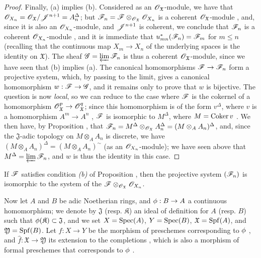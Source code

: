 \begin{proof}
Finally, (a) implies (b).
Considered as an $\mathscr{O}_\mathfrak{X}$-module, we have that $\mathscr{O}_{X_n}=\mathscr{O}_\mathfrak{X}/\mathscr{J}^{n+1}=A_n^\Delta$; but $\mathscr{F}_n=\mathscr{F}\otimes_{\mathscr{O}_\mathfrak{X}}\mathscr{O}_{X_n}$ is a coherent $\mathscr{O}_\mathfrak{X}$-module , and, since it is also an $\mathscr{O}_{X_n}$-module, and $\mathscr{J}^{n+1}$ is coherent, we conclude that $\mathscr{F}_n$ is a coherent $\mathscr{O}_{X_n}$-module , and it is immediate that $u_{mn}^*(\mathscr{F}_n)=\mathscr{F}_m$ for $m\leq n$ (recalling that the continuous map $X_m\to X_n$ of the underlying spaces is the identity on $\mathfrak{X}$).
The sheaf $\mathscr{G}=\varprojlim\mathscr{F}_n$ is thus a coherent $\mathscr{O}_\mathfrak{X}$-module, since we have seen that (b) implies (a). The canonical homomorphisms $\sh{F}\to\sh{F}_n$ form a projective system, which, by passing to the limit, gives a canonical homomorphism $w:\sh{F}\to\sh{G}$, and it remains only to prove that $w$ is bijective.
The question is now \emph{local}, so we can reduce to the case where $\mathscr{F}$ is the cokernel of a homomorphism $\sh{O}_\mathfrak{X}^p\to\sh{O}_\mathfrak{X}^q$; since this homomorphism is of the form $v^\Delta$, where $v$ is a homomorphism $A^m\to A^n$ , $\mathscr{F}$ is isomorphic to $M^\Delta$, where $M=\operatorname{Coker}{v}$ .
We then have, by Proposition , that $\mathscr{F}_n=M^\Delta\otimes_{\mathscr{O}_\mathfrak{X}}A_n^\Delta=(M\otimes_A A_n)^\Delta$, and, since the $\mathfrak{J}$-adic topology on $M\otimes_A A_n$ is discrete, we have $(M\otimes_A A_n)^\Delta=(M\otimes_A A_n)^\sim$ (as an $\mathscr{O}_{X_n}$-module); we have seen above that $M^\Delta=\varprojlim\mathscr{F}_n$, and $w$ is thus the identity in this case.
\end{proof}

\begin{corollary}[10.10.6]
\label{I.10.10.6}
If $\mathscr{F}$ satisfies condition \emph{(b)} of Proposition , then the projective system $(\mathscr{F}_n)$ is isomorphic to the system of the $\mathscr{F}\otimes_{\mathscr{O}_\mathfrak{X}}\mathscr{O}_{X_n}$.
\end{corollary}

\begin{env}[10.10.7]
\label{I.10.10.7}
Now let $A$ and $B$ be adic Noetherian rings, and $\vphi:B\to A$ a continuous homomorphism; we denote by $\mathfrak{J}$ (resp. $\mathfrak{K}$) an ideal of definition for $A$ (resp. $B$) such that $\phi(\mathfrak{K})\subset\mathfrak{J}$, and we set $X=\operatorname{Spec}(A)$, $Y=\operatorname{Spec}(B)$, $\mathfrak{X}=\operatorname{Spf}(A)$, and $\mathfrak{Y}=\operatorname{Spf}(B)$.
Let $f:X\to Y$ be the morphism of preschemes corresponding to $\phi$ , and $\widehat{f}:\mathfrak{X}\to\mathfrak{Y}$ its extension to the completions , which is also a morphism of formal preschemes that corresponds to $\phi$ .
\end{env}

